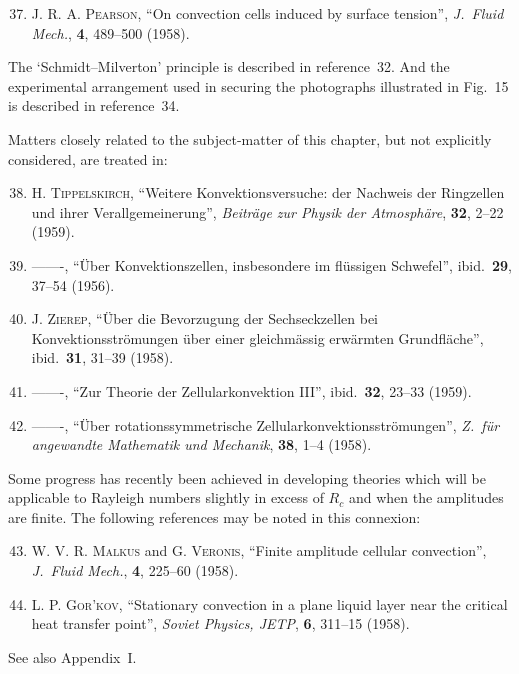 \begin{enumerate}
\setcounter{enumi}{36}

\item \textsc{J. R. A. Pearson}, ``On convection cells induced by surface tension'',
  \textit{J.\ Fluid Mech.}, \textbf{4}, 489--500 (1958).

\end{enumerate}

\noindent The `Schmidt--Milverton' principle is described in reference~32. And the experimental
arrangement used in securing the photographs illustrated in Fig.~15 is
described in reference~34.

\medskip

\noindent Matters closely related to the subject-matter of this chapter, but not explicitly
considered, are treated in:

\begin{enumerate}
\setcounter{enumi}{37}

\item \textsc{H. Tippelskirch}, ``Weitere Konvektionsversuche: der Nachweis der
  Ringzellen und ihrer Verallgemeinerung'', \textit{Beitr\"age zur Physik der
  Atmosph\"are}, \textbf{32}, 2--22 (1959).

\item -------, ``\"Uber Konvektionszellen, insbesondere im fl\"ussigen Schwefel'',
  ibid.\ \textbf{29}, 37--54 (1956).

\item \textsc{J. Zierep}, ``\"Uber die Bevorzugung der Sechseckzellen bei Konvektionsstr\"omungen
  \"uber einer gleichm\"assig erw\"armten Grundfl\"ache'', ibid.\ \textbf{31}, 31--39
  (1958).

\item -------, ``Zur Theorie der Zellularkonvektion III'', ibid.\ \textbf{32}, 23--33 (1959).

\item -------, ``\"Uber rotationssymmetrische Zellularkonvektionsstr\"omungen'',
  \textit{Z.\ f\"ur angewandte Mathematik und Mechanik}, \textbf{38}, 1--4 (1958).

\end{enumerate}

\noindent Some progress has recently been achieved in developing theories which will be
applicable to Rayleigh numbers slightly in excess of $R_c$ and when the amplitudes
are finite. The following references may be noted in this connexion:

\begin{enumerate}
\setcounter{enumi}{42}

\item \textsc{W. V. R. Malkus} and \textsc{G. Veronis}, ``Finite amplitude cellular convection'',
  \textit{J.\ Fluid Mech.}, \textbf{4}, 225--60 (1958).

\item \textsc{L. P. Gor'kov}, ``Stationary convection in a plane liquid layer near the
  critical heat transfer point'', \textit{Soviet Physics, JETP}, \textbf{6}, 311--15 (1958).

\end{enumerate}

\noindent See also Appendix~I.
